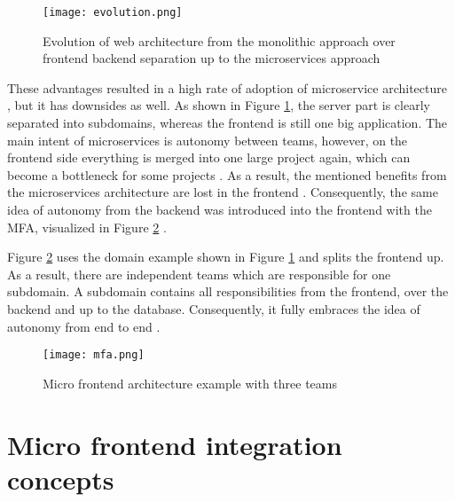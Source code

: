 \begin{figure}[h]
    \centering
    \texttt{[image: evolution.png]}
    \caption{Evolution of web architecture from the monolithic approach over frontend backend separation up to the microservices approach \cite[p.~17]{Wenzel.2020}}
    \label{img:evolution_of_web_architecture}
\end{figure}

These advantages resulted in a high rate of adoption of microservice architecture \cite{McCall.2019}, but it has downsides as well.
As shown in Figure \ref{img:evolution_of_web_architecture}, the server part is clearly separated into subdomains, whereas the frontend is still one big application.
The main intent of microservices is autonomy between teams, however, on the frontend side everything is  merged into one large project again, which can become a bottleneck for some projects \cite[p.~18]{Wenzel.2020}.
As a result, the mentioned benefits from the microservices architecture are lost in the frontend \cite{Leitner.2020}. %
Consequently, the same idea of autonomy from the backend was introduced into the frontend with the \ac{MFA}, visualized in Figure \ref{img:micro_frontends_approach_detail} \cite{Geers.2019}.

Figure \ref{img:micro_frontends_approach_detail} uses the domain example shown in Figure \ref{img:evolution_of_web_architecture} and splits the frontend up.
As a result, there are independent teams which are responsible for one subdomain.
A subdomain contains all responsibilities from the frontend, over the backend and up to the database.
Consequently, it fully embraces the idea of autonomy from end to end \cite[p.18f.]{Wenzel.2020}.

\begin{figure}[h]
    \centering
    \texttt{[image: mfa.png]}
    \caption{Micro frontend architecture example with three teams \cite[p.~19]{Wenzel.2020}}
    \label{img:micro_frontends_approach_detail}
\end{figure}





\section{Micro frontend integration concepts}\label{cha:theory:concepts}

